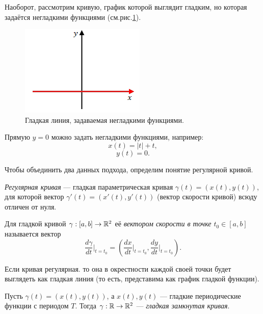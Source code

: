 \begin{example}
    Наоборот, рассмотрим кривую, график которой выглядит гладким, но которая задаётся негладкими функциями (см.рис.\ref{fig:c12.3}).
    \begin{figure}[htbp]
        \centering
        \includegraphics[scale=0.7]{images/c12.3.png}
        \caption{Гладкая линия, задаваемая негладкими функциями.}
        \label{fig:c12.3}
    \end{figure}
    Прямую $y = 0$ можно задать негладкими функциями, например:
    \[x(t) = |t| + t,\]
    \[y(t) = 0.\]
\end{example}

Чтобы объединить два данных подхода, определим понятие регулярной кривой.

\begin{definition}
    \textit{Регулярная кривая} — гладкая параметрическая кривая $\gamma(t) = (x(t), y(t))$, для которой вектор $\gamma'(t) = (x'(t), y'(t))$ (вектор скорости кривой) всюду отличен от нуля.
\end{definition}

\begin{definition}
    Для гладкой кривой $\gamma: [a,b] \to \mathbb{R}^2$ её \textit{вектором скорости в точке $t_0 \in [a,b]$} называется вектор 
    \[\frac{d\gamma}{dt}\Big|_{t=t_0} = \left(\frac{dx}{dt}\Big|_{t=t_0}, \frac{dy}{dt}\Big|_{t=t_0}\right).\]
\end{definition}

\begin{remark}
    Если кривая регулярная. то она в окрестности каждой своей точки будет выглядеть как гладкая линия (то есть, представима как график гладкой функции).
\end{remark}

\begin{definition}
    Пусть $\gamma(t) = (x(t), y(t))$, а $x(t), y(t)$ — гладкие периодические функции с периодом $T$. Тогда $\gamma: \mathbb{R} \to \mathbb{R}^2$ — \textit{гладкая замкнутая кривая}.
\end{definition} 

